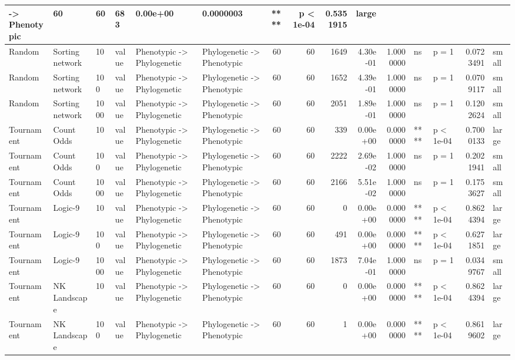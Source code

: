 \documentclass[]{book}
\begin{document}
\begin{table}
\begin{tabular}[t]{l|l|l|l|l|l|r|r|r|r|r|l|l|r|l}
    ->
Phenotypic & 60 & 60 & 683 & 0.00e+00 & 0.0000003 & **** & p < 1e-04 & 0.5351915 & large\\
\hline
Random & Sorting network & 10 & value & Phenotypic
    ->
Phylogenetic & Phylogenetic
    ->
Phenotypic & 60 & 60 & 1649 & 4.30e-01 & 1.0000000 & ns & p = 1 & 0.0723491 & small\\
\hline
Random & Sorting network & 100 & value & Phenotypic
    ->
Phylogenetic & Phylogenetic
    ->
Phenotypic & 60 & 60 & 1652 & 4.39e-01 & 1.0000000 & ns & p = 1 & 0.0709117 & small\\
\hline
Random & Sorting network & 1000 & value & Phenotypic
    ->
Phylogenetic & Phylogenetic
    ->
Phenotypic & 60 & 60 & 2051 & 1.89e-01 & 1.0000000 & ns & p = 1 & 0.1202624 & small\\
\hline
Tournament & Count Odds & 10 & value & Phenotypic
    ->
Phylogenetic & Phylogenetic
    ->
Phenotypic & 60 & 60 & 339 & 0.00e+00 & 0.0000000 & **** & p < 1e-04 & 0.7000133 & large\\
\hline
Tournament & Count Odds & 100 & value & Phenotypic
    ->
Phylogenetic & Phylogenetic
    ->
Phenotypic & 60 & 60 & 2222 & 2.69e-02 & 1.0000000 & ns & p = 1 & 0.2021941 & small\\
\hline
Tournament & Count Odds & 1000 & value & Phenotypic
    ->
Phylogenetic & Phylogenetic
    ->
Phenotypic & 60 & 60 & 2166 & 5.51e-02 & 1.0000000 & ns & p = 1 & 0.1753627 & small\\
\hline
Tournament & Logic-9 & 10 & value & Phenotypic
    ->
Phylogenetic & Phylogenetic
    ->
Phenotypic & 60 & 60 & 0 & 0.00e+00 & 0.0000000 & **** & p < 1e-04 & 0.8624394 & large\\
\hline
Tournament & Logic-9 & 100 & value & Phenotypic
    ->
Phylogenetic & Phylogenetic
    ->
Phenotypic & 60 & 60 & 491 & 0.00e+00 & 0.0000000 & **** & p < 1e-04 & 0.6271851 & large\\
\hline
Tournament & Logic-9 & 1000 & value & Phenotypic
    ->
Phylogenetic & Phylogenetic
    ->
Phenotypic & 60 & 60 & 1873 & 7.04e-01 & 1.0000000 & ns & p = 1 & 0.0349767 & small\\
\hline
Tournament & NK Landscape & 10 & value & Phenotypic
    ->
Phylogenetic & Phylogenetic
    ->
Phenotypic & 60 & 60 & 0 & 0.00e+00 & 0.0000000 & **** & p < 1e-04 & 0.8624394 & large\\
\hline
Tournament & NK Landscape & 100 & value & Phenotypic
    ->
Phylogenetic & Phylogenetic
    ->
Phenotypic & 60 & 60 & 1 & 0.00e+00 & 0.0000000 & **** & p < 1e-04 & 0.8619602 & large\\

\end{tabular}
\end{table}
\end{document}
